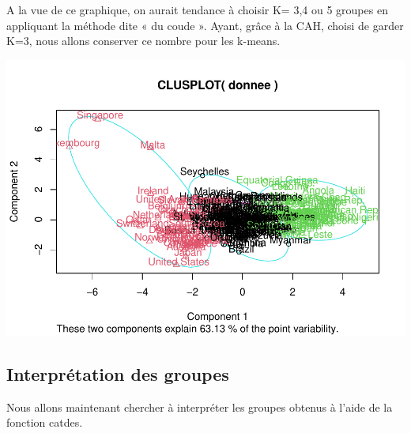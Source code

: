 \documentclass[
]{article}
\newenvironment{Shaded}{}{}
\newcommand{\AttributeTok}[1]{#1}
\newcommand{\DecValTok}[1]{#1}
\newcommand{\FunctionTok}[1]{#1}
\newcommand{\NormalTok}[1]{#1}
\newcommand{\OtherTok}[1]{\textcolor[rgb]{1.00,0.25,0.00}{#1}}
\newcommand{\SpecialCharTok}[1]{\textcolor[rgb]{0.00,0.50,0.50}{#1}}
\begin{document}
A la vue de ce graphique, on aurait tendance à choisir K= 3,4 ou 5
groupes en appliquant la méthode dite « du coude ». Ayant, grâce à la
CAH, choisi de garder K=3, nous allons conserver ce nombre pour les
k-means.

\begin{Shaded}
\end{Shaded}

\includegraphics{Projet_files/figure-latex/unnamed-chunk-23-1.pdf}

\hypertarget{interpruxe9tation-des-groupes}{%
\subsection{Interprétation des
groupes}\label{interpruxe9tation-des-groupes}}

Nous allons maintenant chercher à interpréter les groupes obtenus à
l'aide de la fonction catdes.

\begin{Shaded}
\end{Shaded}
\end{document}

